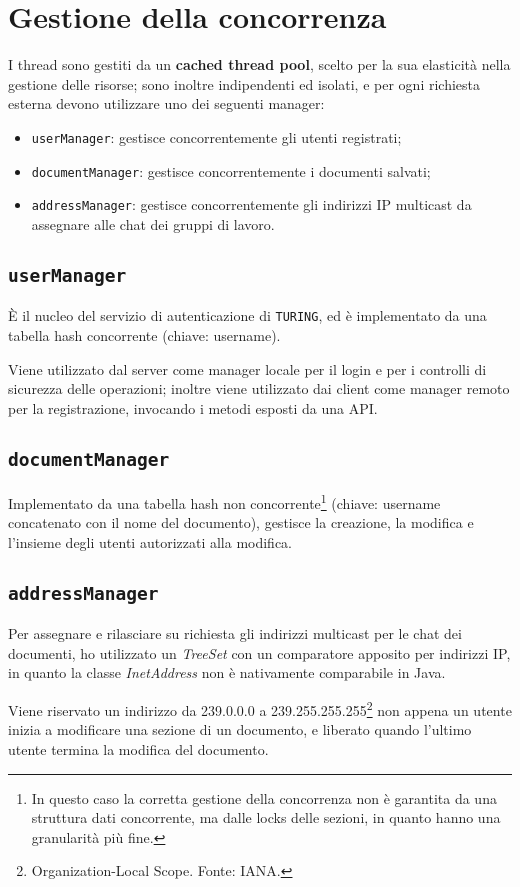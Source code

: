 \section{Gestione della concorrenza}
I thread sono gestiti da un \textbf{cached thread pool}, scelto per la sua elasticità nella gestione delle risorse; sono inoltre indipendenti ed isolati, e per ogni richiesta esterna devono utilizzare uno dei seguenti manager:

\begin{itemize}
	\item \texttt{userManager}: gestisce concorrentemente gli utenti registrati;
	\item \texttt{documentManager}: gestisce concorrentemente i documenti salvati;
	\item \texttt{addressManager}: gestisce concorrentemente gli indirizzi IP multicast da assegnare alle chat dei gruppi di lavoro.
\end{itemize}

\subsection{\texttt{userManager}}
È il nucleo del servizio di autenticazione di \texttt{TURING}, ed è implementato da una tabella hash concorrente (chiave: username).

Viene utilizzato dal server come manager locale per il login e per i controlli di sicurezza delle operazioni; inoltre viene utilizzato dai client come manager remoto per la registrazione, invocando i metodi esposti da una API.

\subsection{\texttt{documentManager}}
Implementato da una tabella hash non concorrente\footnote{In questo caso la corretta gestione della concorrenza non è garantita da una struttura dati concorrente, ma dalle locks delle sezioni, in quanto hanno una granularità più fine.} (chiave: username concatenato con il nome del documento), gestisce la creazione, la modifica e l'insieme degli utenti autorizzati alla modifica.

\subsection{\texttt{addressManager}}
Per assegnare e rilasciare su richiesta gli indirizzi multicast per le chat dei documenti, ho utilizzato un \textit{TreeSet} con un comparatore apposito per indirizzi IP, in quanto la classe \textit{InetAddress} non è nativamente comparabile in Java.

Viene riservato un indirizzo da 239.0.0.0 a 239.255.255.255\footnote{Organization-Local Scope. Fonte: IANA.} non appena un utente inizia a modificare una sezione di un documento, e liberato quando l'ultimo utente termina la modifica del documento.
